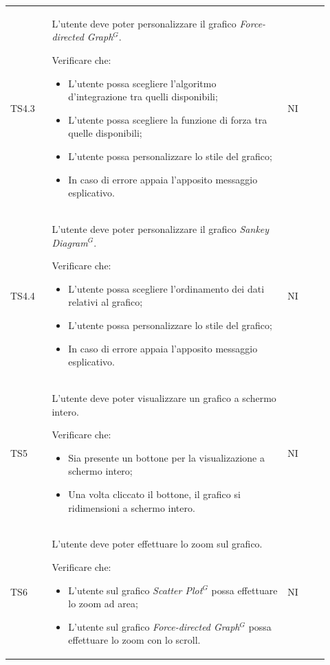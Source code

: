 \begin{longtable}{p{0.12\linewidth}p{0.68\linewidth}p{0.12\linewidth}}
    \rowcolor[RGB]{233, 245, 206}
    TS4.3 &
    L'utente deve poter personalizzare il grafico \textit{Force-directed Graph}$^{G}$. \par
    Verificare che:
    \begin{itemize}
        \item L'utente possa scegliere l'algoritmo d'integrazione tra quelli disponibili;
        \item L'utente possa scegliere la funzione di forza tra quelle disponibili;
        \item L'utente possa personalizzare lo stile del grafico;
        \item In caso di errore appaia l'apposito messaggio esplicativo.
    \end{itemize}&
    NI \\ 

    \rowcolor[RGB]{216, 235, 171}
    TS4.4 &
    L'utente deve poter personalizzare il grafico \textit{Sankey Diagram}$^{G}$. \par
    Verificare che:
    \begin{itemize}
        \item L'utente possa scegliere l'ordinamento dei dati relativi al grafico;
        \item L'utente possa personalizzare lo stile del grafico;
        \item In caso di errore appaia l'apposito messaggio esplicativo.
    \end{itemize}&
    NI \\

    \rowcolor[RGB]{233, 245, 206}
    TS5 &
    L'utente deve poter visualizzare un grafico a schermo intero. \par 
    Verificare che:
    \begin{itemize}
        \item Sia presente un bottone per la visualizazione a schermo intero;
        \item Una volta cliccato il bottone, il grafico si ridimensioni a schermo intero.
    \end{itemize}&
    NI \\

    \rowcolor[RGB]{216, 235, 171}
    TS6 &
    L'utente deve poter effettuare lo zoom sul grafico. \par 
    Verificare che:
    \begin{itemize}
        \item L'utente sul grafico \textit{Scatter Plot}$^{G}$ possa effettuare lo zoom ad area;
        \item L'utente sul grafico \textit{Force-directed Graph}$^{G}$ possa effettuare lo zoom con lo scroll.
    \end{itemize}&
    NI \\


\end{longtable}
